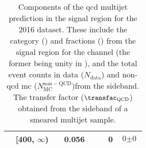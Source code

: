 \begin{table}[htbp]
\begin{tabular*}{\linewidth}{@{\extracolsep{\fill}}llclcccr}
& [400, $\infty$) & & 0.056 & & & 0 & $\text{0} \pm \text{0}$ \\
\bottomrule
\end{tabular*}
\caption[Components of the \acrshort{qcd} multijet prediction in the signal region for the 2016 dataset]{Components of the \acrshort{qcd} multijet prediction in the signal region for the 2016 dataset. These include the category (\catFraction) and \ptmiss fractions (\metFraction) from the signal region for the \ttH channel (the former being unity in \VH), and the total event counts in data ($N_{\mathrm{data}}$) and non-\acrshort{qcd} \acrshort{mc} ($N_{\mathrm{MC}}^{\mathrm{non-QCD}}$)from the sideband. The transfer factor ($\transfac_{\mathrm{QCD}}$) obtained from the sideband of a smeared multijet sample.}
\label{tab:htoinv_qcd_pred_2016}
\end{table}


